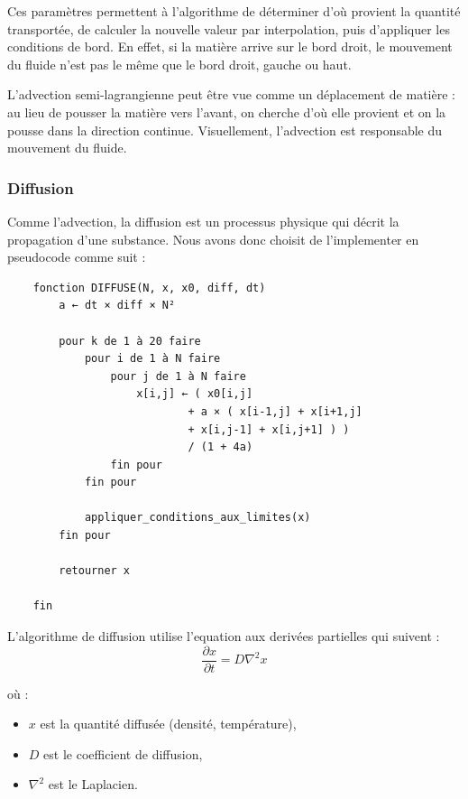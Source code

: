 \documentclass[a4paper]{article}
\begin{document}
Ces paramètres permettent à l’algorithme de déterminer d’où provient la quantité transportée, 
de calculer la nouvelle valeur par interpolation, puis d’appliquer les conditions de bord. En effet,
si la matière arrive sur le bord droit, le mouvement du fluide n'est pas le même que le bord droit, gauche ou haut.



L'advection semi-lagrangienne peut être vue comme un déplacement de matière : au lieu de pousser la matière vers l'avant, on cherche d'où elle provient et on la pousse dans la direction continue. Visuellement, l'advection est responsable du mouvement du fluide.


\subsubsection{Diffusion}

\hspace*{\parindent} Comme l'advection, la diffusion est un processus physique qui décrit la propagation d'une substance. Nous avons donc choisit de l'implementer en pseudocode comme suit :


\begin{verbatim}
    fonction DIFFUSE(N, x, x0, diff, dt)
        a ← dt × diff × N²

        pour k de 1 à 20 faire
            pour i de 1 à N faire 
                pour j de 1 à N faire     
                    x[i,j] ← ( x0[i,j]             
                            + a × ( x[i-1,j] + x[i+1,j]     
                            + x[i,j-1] + x[i,j+1] ) )             
                            / (1 + 4a) 
                fin pour
            fin pour

            appliquer_conditions_aux_limites(x)
        fin pour

        retourner x

    fin
\end{verbatim}


L'algorithme de diffusion utilise l'equation aux derivées partielles qui suivent :
\begin{equation*}
    \frac{\partial x}{\partial t} = D \nabla^2 x
\end{equation*}

où :
\begin{itemize}
    \item $x$ est la quantité diffusée (densité, température),
    \item $D$ est le coefficient de diffusion,
    \item $\nabla^2$ est le Laplacien.
\end{itemize}
\end{document}
